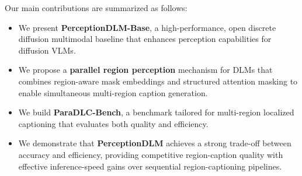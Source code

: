 %
Our main contributions are summarized as follows:
%
\begin{itemize}
    \item We present \textbf{PerceptionDLM-Base}, a high-performance, open discrete diffusion multimodal baseline that enhances perception capabilities for diffusion VLMs.
    \item We propose a \textbf{parallel region perception} mechanism for DLMs that combines region-aware mask embeddings and structured attention masking to enable simultaneous multi-region caption generation.
    \item We build \textbf{ParaDLC-Bench}, a benchmark tailored for multi-region localized captioning that evaluates both quality and efficiency.
    \item We demonstrate that \textbf{PerceptionDLM} achieves a strong trade-off between accuracy and efficiency, providing competitive region-caption quality with effective inference-speed gains over sequential region-captioning pipelines.
\end{itemize}